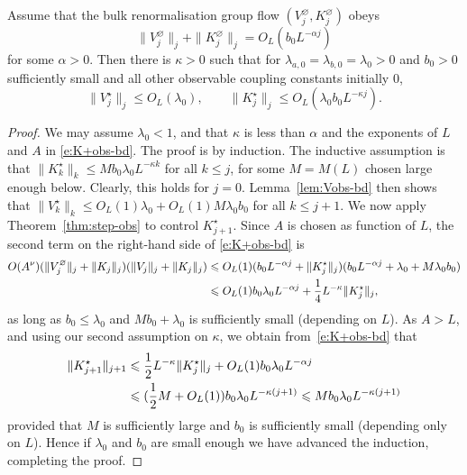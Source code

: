 \documentclass[11pt]{amsart}
\numberwithin{equation}{section}
\numberwithin{theorem}{section}
\newcommand{\1}{{\bf 1}}
\newcommand{\obs}{\star}
\newcommand{\Vbulk}{V^\varnothing}
\newcommand{\Vobs}{V^\obs}
\newcommand{\Kbulk}{K^\varnothing}
\newcommand{\Kobs}{K^\obs}
\newcommand{\OL}{O_L}
\begin{document}
\begin{proposition}
\label{prop:flow-obs}
  Assume that the bulk renormalisation group flow $(\Vbulk_j,\Kbulk_j)$ obeys
  \begin{equation}
     \label{e:flowVK-bis-1}
     \|\Vbulk_j\|_j+\|\Kbulk_j\|_j = \OL(b_0L^{-\alpha j})
  \end{equation}
  for some $\alpha>0$.
  Then there is $\kappa>0$ such that for
  $\lambda_{a,0}=\lambda_{b,0}=\lambda_0 >0$ and $b_0>0$ sufficiently small 
  and all other observable coupling constants initially $0$,
  \begin{equation} \label{e:flowVKobs}
    \|\Vobs_j\|_j \leq \OL(\lambda_0), \qquad \|\Kobs_j\|_j \leq \OL(\lambda_0b_0L^{-\kappa j}).
  \end{equation}
\end{proposition}
\begin{proof}
    We may assume $\lambda_{0}<1$,
    and that $\kappa$ is less than $\alpha$ and the exponents of $L$ and $A$ in \eqref{e:K+obs-bd}.
    The proof is by induction.
    The inductive assumption is that $\|\Kobs_k\|_{k} \leq M b_0\lambda_0L^{-\kappa k}$ for all $k \leq j$,
    for some  $M=M(L)$ chosen large enough below.  Clearly, this holds for
    $j=0$.  Lemma~\ref{lem:Vobs-bd} then shows that
    $\|\Vobs_{k}\|_k\leq O_L(1)\lambda_0 + O_L(1) M \lambda_0b_0$ for all
    $k\leq j+1$.  We now apply Theorem~\ref{thm:step-obs} to control $\Kobs_{j+1}$.
    Since $A$ is chosen as function of $L$,
    the second term on the right-hand side of \eqref{e:K+obs-bd} is
    \begin{align}
      O(A^{\nu}) (\|\Vbulk_j\|_j +\|K_{j}\|_{j})      (\|V_j\|_j+\|K_j\|_j)
      &\leq O_L(1) (b_0L^{-\alpha j} + \|K_j^\obs\|_j)(b_0L^{-\alpha j} + \lambda_0 + M\lambda_0b_0)
        \nnb
      &\leq O_L(1)
        b_0\lambda_0 L^{-\alpha j} + \frac14 L^{-\kappa} \|K_j^\obs\|_j,
    \end{align}
    as long as $b_0\leq \lambda_0$ and $Mb_0 +
    \lambda_0$ is sufficiently small (depending on $L$).  As
    $A>L$, and using our second assumption on
    $\kappa$, we obtain from~\eqref{e:K+obs-bd} that
    \begin{align}
      \|\Kobs_{j+1}\|_{j+1}
      &\leq \frac12 L^{-\kappa}\|\Kobs_j\|_j + \OL(1)
        b_0\lambda_0 L^{-\alpha j}
      \nnb
      &\leq (\frac12 M + \OL(1)
        ) b_0\lambda_0 L^{-\kappa (j+1)}
      \leq M b_0\lambda_0 L^{-\kappa (j+1)}
    \end{align}
    provided that $M$ is sufficiently large and
    $b_0$ is sufficiently small (depending only on $L$).
    Hence if $\lambda_0$ and $b_0$ are small enough we have advanced the induction,
    completing the proof.
\end{proof}
\end{document}

